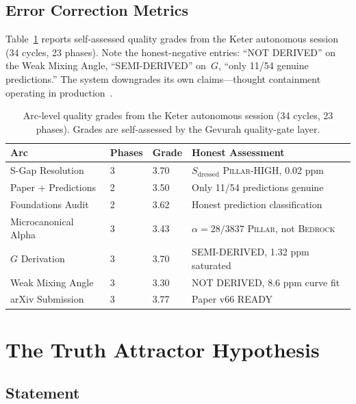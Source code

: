 \documentclass[11pt]{article}
\theoremstyle{definition}
\theoremstyle{remark}
\newcommand{\BEDROCK}{\textsc{Bedrock}}
\newcommand{\PILLAR}{\textsc{Pillar}}
\begin{document}
\subsection{Error Correction Metrics}
\label{sec:error-correction-metrics}

Table~\ref{tab:arc-metrics} reports self-assessed quality grades from the Keter
autonomous session (34 cycles, 23 phases).  Note the honest-negative entries:
``NOT DERIVED'' on the Weak Mixing Angle, ``SEMI-DERIVED'' on~$G$, ``only 11/54
genuine predictions.''  The system downgrades its own claims---thought
containment operating in production~\cite{kadavath2022llm}.

\begin{table}[ht]
\centering
\caption{Arc-level quality grades from the Keter autonomous session (34 cycles,
  23 phases).  Grades are self-assessed by the Gevurah quality-gate layer.}
\label{tab:arc-metrics}
\begin{tabular}{@{}llll@{}}
\toprule
\textbf{Arc} & \textbf{Phases} & \textbf{Grade} & \textbf{Honest Assessment} \\
\midrule
S-Gap Resolution          & 3 & 3.70 & $S_\mathrm{dressed}$ \PILLAR-HIGH, 0.02 ppm \\
Paper + Predictions       & 2 & 3.50 & Only 11/54 predictions genuine \\
Foundations Audit         & 2 & 3.62 & Honest prediction classification \\
Microcanonical Alpha      & 3 & 3.43 & $\alpha = 28/3837$ \PILLAR, not \BEDROCK \\
$G$ Derivation            & 3 & 3.70 & SEMI-DERIVED, 1.32 ppm saturated \\
Weak Mixing Angle         & 3 & 3.30 & NOT DERIVED, 8.6 ppm curve fit \\
arXiv Submission          & 3 & 3.77 & Paper v66 READY \\
\bottomrule
\end{tabular}
\end{table}

\section{The Truth Attractor Hypothesis}
\label{sec:truth-attractor}

\subsection{Statement}
\label{sec:attractor-statement}
\end{document}
